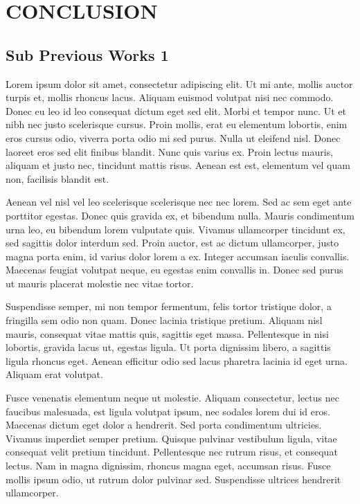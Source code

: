 \chapter{CONCLUSION}

\section{Sub Previous Works 1}
Lorem ipsum dolor sit amet, consectetur adipiscing elit. Ut mi ante, mollis auctor turpis et, mollis rhoncus lacus. Aliquam euismod volutpat nisi nec commodo. Donec eu leo id leo consequat dictum eget sed elit. Morbi et tempor nunc. Ut et nibh nec justo scelerisque cursus. Proin mollis, erat eu elementum lobortis, enim eros cursus odio, viverra porta odio mi sed purus. Nulla ut eleifend nisl. Donec laoreet eros sed elit finibus blandit. Nunc quis varius ex. Proin lectus mauris, aliquam et justo nec, tincidunt mattis risus. Aenean est est, elementum vel quam non, facilisis blandit est.

Aenean vel nisl vel leo scelerisque scelerisque nec nec lorem. Sed ac sem eget ante porttitor egestas. Donec quis gravida ex, et bibendum nulla. Mauris condimentum urna leo, eu bibendum lorem vulputate quis. Vivamus ullamcorper tincidunt ex, sed sagittis dolor interdum sed. Proin auctor, est ac dictum ullamcorper, justo magna porta enim, id varius dolor lorem a ex. Integer accumsan iaculis convallis. Maecenas feugiat volutpat neque, eu egestas enim convallis in. Donec sed purus ut mauris placerat molestie nec vitae tortor.

Suspendisse semper, mi non tempor fermentum, felis tortor tristique dolor, a fringilla sem odio non quam. Donec lacinia tristique pretium. Aliquam nisl mauris, consequat vitae mattis quis, sagittis eget massa. Pellentesque in nisi lobortis, gravida lacus ut, egestas ligula. Ut porta dignissim libero, a sagittis ligula rhoncus eget. Aenean efficitur odio sed lacus pharetra lacinia id eget urna. Aliquam erat volutpat.

Fusce venenatis elementum neque ut molestie. Aliquam consectetur, lectus nec faucibus malesuada, est ligula volutpat ipsum, nec sodales lorem dui id eros. Maecenas dictum eget dolor a hendrerit. Sed porta condimentum ultricies. Vivamus imperdiet semper pretium. Quisque pulvinar vestibulum ligula, vitae consequat velit pretium tincidunt. Pellentesque nec rutrum risus, et consequat lectus. Nam in magna dignissim, rhoncus magna eget, accumsan risus. Fusce mollis ipsum odio, ut rutrum dolor pulvinar sed. Suspendisse ultrices hendrerit ullamcorper.

